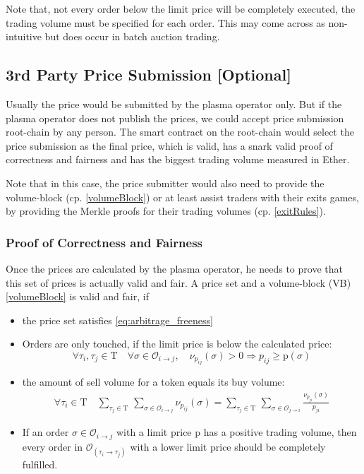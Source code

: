 \documentclass[11pt,parskip=full]{scrartcl}%
\newcommand{\Tau}{\mathrm{T}}
\def\pO{\mathcal{O}}
\def\ra{\rightarrow}
\begin{document}
Note that, not every order below the limit price will be completely executed, the trading volume must be specified for each order.
This may come across as non-intuitive but does occur in batch auction trading.

\subsection*{3rd Party Price Submission [Optional]}
\label{publicPrices}
Usually the price would be submitted by the plasma operator only. 
But if the plasma operator does not publish the prices, we could accept price submission root-chain by any person. 
The smart contract on the root-chain would select the price submission as the final price, which is valid, has a snark valid proof of correctness and fairness and has the biggest trading volume measured in Ether. 

Note that in this case, the price submitter would also need to provide the volume-block (cp. \ref{volumeBlock}) or at least assist traders with their exits games, by providing the Merkle proofs for their trading volumes (cp. \ref{exitRules}). 

\subsubsection{Proof of Correctness and Fairness}
\label{proofprices}
Once the prices are calculated by the plasma operator, he needs to prove that this set of prices is actually valid and fair. A price set and a volume-block (VB) \ref{volumeBlock} is valid and fair, if

\begin{itemize}

\item the price set satisfies \ref{eq:arbitrage_freeness} 
\item Orders are only touched, if the limit price is below the calculated price:\newline
\begin{equation} \forall \tau_i ,\tau_j \in \Tau \quad \forall \sigma \in \pO_{i\ra j}, \quad \nu_{p_{ij}}(\sigma)>0 \Rightarrow p_{ij}\geq \text{p}(\sigma)
\end{equation}
\item the amount of sell volume for a token equals its buy volume: 
\begin{equation}
\begin{split}
\forall \tau_i \in \Tau \quad \sum_{\tau_j\in \Tau} \,
\sum_{ \sigma\in \pO_{i \rightarrow j}} \nu_{p_{ij}}(\sigma) = \sum_{\tau_j\in \Tau} \, \sum_{\sigma\in \pO_{j\rightarrow i}} \frac{\nu_{p_{ji}}(\sigma)}{p_{ji}}
\end{split}
\end{equation}
\item If an order $\sigma \in \pO_{i\rightarrow j}$ with a limit price p has a positive trading volume, then every order in $\pO_{(\tau_i\rightarrow \tau_j)}$ with a lower limit price should be completely fulfilled. 
\end{itemize}
\end{document}
